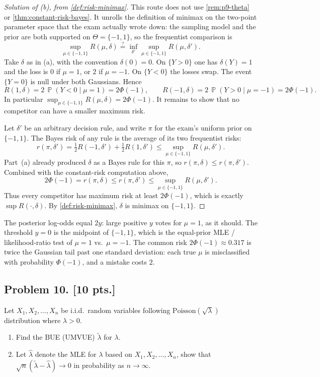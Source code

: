 \documentclass[11pt,a4paper]{article}
\DeclareMathOperator{\Pbb}{\mathbb{P}}
\begin{document}
\begin{proof}[Solution of (b), from \cref{def:risk-minimax}]
This route does not use \cref{rem:p9-theta} or \cref{thm:constant-risk-bayes}. It unrolls the definition of minimax on the two-point parameter space that the exam actually wrote down: the sampling model and the prior are both supported on \(\Theta=\{-1,1\}\), so the frequentist comparison is
\[
\sup_{\mu\in\{-1,1\}} R(\mu,\delta)
\stackrel{?}{=}
\inf_{\delta'}\sup_{\mu\in\{-1,1\}} R(\mu,\delta').
\]
Take \(\delta\) as in (a), with the convention \(\delta(0)=0\). On \(\{Y>0\}\) one has \(\delta(Y)=1\) and the loss is \(0\) if \(\mu=1\), or \(2\) if \(\mu=-1\). On \(\{Y<0\}\) the losses swap. The event \(\{Y=0\}\) is null under both Gaussians. Hence
\[
R(1,\delta)
=
2\,\Pbb(Y<0\mid\mu=1)
=
2\Phi(-1),
\qquad
R(-1,\delta)
=
2\,\Pbb(Y>0\mid\mu=-1)
=
2\Phi(-1).
\]
In particular \(\sup_{\mu\in\{-1,1\}}R(\mu,\delta)=2\Phi(-1)\). It remains to show that no competitor can have a smaller maximum risk.

Let \(\delta'\) be an arbitrary decision rule, and write \(\pi\) for the exam's uniform prior on \(\{-1,1\}\). The Bayes risk of any rule is the average of its two frequentist risks:
\[
r(\pi,\delta')
=
\tfrac12 R(-1,\delta')
+
\tfrac12 R(1,\delta')
\le
\sup_{\mu\in\{-1,1\}} R(\mu,\delta').
\]
Part~(a) already produced \(\delta\) as a Bayes rule for this \(\pi\), so \(r(\pi,\delta)\le r(\pi,\delta')\). Combined with the constant-risk computation above,
\[
2\Phi(-1)
=
r(\pi,\delta)
\le
r(\pi,\delta')
\le
\sup_{\mu\in\{-1,1\}} R(\mu,\delta').
\]
Thus every competitor has maximum risk at least \(2\Phi(-1)\), which is exactly \(\sup R(\cdot,\delta)\). By \cref{def:risk-minimax}, \(\delta\) is minimax on \(\{-1,1\}\).
\end{proof}

\begin{remark}
\label{rem:p9-checks}
The posterior log-odds equal \(2y\): large positive \(y\) votes for \(\mu=1\), as it should. The threshold \(y=0\) is the midpoint of \(\{-1,1\}\), which is the equal-prior MLE / likelihood-ratio test of \(\mu=1\) vs.\ \(\mu=-1\). The common risk \(2\Phi(-1)\approx 0.317\) is twice the Gaussian tail past one standard deviation: each true \(\mu\) is misclassified with probability \(\Phi(-1)\), and a mistake costs \(2\).
\end{remark}

\subsection{Problem 10. [10 pts.]}
Let \( X_1, X_2, \dots, X_n \) be i.i.d.\ random variables following \( \mathrm{Poisson}(\sqrt{\lambda}) \) distribution where \( \lambda > 0 \).
\begin{enumerate}[label=(\alph*)]
    \item Find the BUE (UMVUE) \( \tilde{\lambda} \) for \( \lambda \).
    \item Let \( \hat{\lambda} \) denote the MLE for \( \lambda \) based on \( X_1, X_2, \dots, X_n \), show that \( \sqrt{n}(\tilde{\lambda} - \hat{\lambda}) \to 0 \) in probability as \( n \to \infty \).
\end{enumerate}
\end{document}
